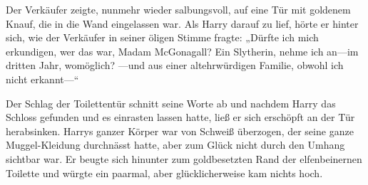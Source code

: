 Der Verkäufer zeigte, nunmehr wieder salbungsvoll, auf eine Tür mit goldenem Knauf, die in die Wand eingelassen war. Als Harry darauf zu lief, hörte er hinter sich, wie der Verkäufer in seiner öligen Stimme fragte: „Dürfte ich mich erkundigen, wer das war, Madam McGonagall? Ein Slytherin, nehme ich an—im dritten Jahr, womöglich? —und aus einer altehrwürdigen Familie, obwohl ich nicht erkannt—“

Der Schlag der Toilettentür schnitt seine Worte ab und nachdem Harry das Schloss gefunden und es einrasten lassen hatte, ließ er sich erschöpft an der Tür herabsinken. Harrys ganzer Körper war von Schweiß überzogen, der seine ganze Muggel-Kleidung durchnässt hatte, aber zum Glück nicht durch den Umhang sichtbar war. Er beugte sich hinunter zum goldbesetzten Rand der elfenbeinernen Toilette und würgte ein paarmal, aber glücklicherweise kam nichts hoch.

\later

